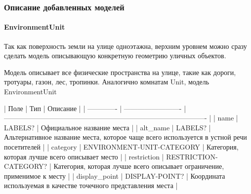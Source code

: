     \subsubsection{Описание добавленных моделей}
      \paragraph{EnvironmentUnit}
        Так как поверхность земли на улице одноэтажна, верхним уровнем можно сразу сделать модель описывающую конкретную геометрию уличных объектов.

        Модель описывает все физические пространства на улице, такие как дороги, тротуары, газон, лес, тропинки. Аналогично комнатам Unit, модель EnvironmentUnit

        | Поле          | Тип                       | Описание                                                                                 |
        | ------------- | ------------------------- | ---------------------------------------------------------------------------------------- |
        | name          | LABELS?                   | Официальное название места                                                               |
        | alt\_name      | LABELS?                   | Альтернативное название места, которое чаще всего используется в устной речи посетителей |
        | category      | ENVIRONMENT-UNIT-CATEGORY | Категория, которая лучше всего описывает место                                           |
        | restriction   | RESTRICTION-CATEGORY?     | Категория, которая лучше всего описывает ограничение, применимое к месту                 |
        | display\_point | DISPLAY-POINT?            | Координата используемая в качестве точечного представления места                         |

